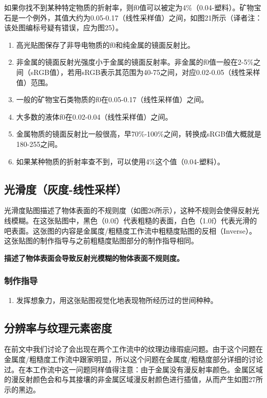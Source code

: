 如果你找不到某种特定物质的折射率，则f0值可以被定为4\%（0.04-塑料）。矿物宝石是一个例外，其值大约为0.05-0.17（线性采样值）之间，如图21所示（译者注：该处图编标号疑有错误，应为图25）。

\begin{enumerate}
\item 高光贴图保存了非导电物质的f0和纯金属的镜面反射比。
\item 非金属的镜面反射光强度小于金属的镜面反射率。非金属的f0值一般在2-5\%之间（sRGB值），若用sRGB表示其范围为40-75之间，对应0.02-0.05（线性采样值）范围。
\item 一般的矿物宝石类物质的f0在0.05-0.17（线性采样值）之间。
\item 大多数的液体f0在0.02-0.04（线性采样值）之间。
\item 金属物质的镜面反射比一般很高，早70\%-100\%之间，转换成sRGB值大概就是180-255之间。
\item 如果某种物质的折射率查不到，可以使用4\%这个值（0.04-塑料）。
\end{enumerate}

\subsection{光滑度（灰度-线性采样）}

光滑度贴图描述了物体表面的不规则度（如图26所示），这种不规则会使得反射光线模糊。在这张贴图中，黑色（0.0f）代表粗糙的表面，白色（1.0f）代表光滑的吧表面。这张图的内容是金属度/粗糙度工作流中粗糙度贴图的反相（Inverse）。这张贴图的制作指导与之前粗糙度贴图部分的制作指导相同。

\textbf{描述了物体表面会导致反射光模糊的物体表面不规则度。}

\subsubsection{制作指导}

\begin{enumerate}
\item 发挥想象力，用这张贴图视觉化地表现物所经历过的世间种种。
\end{enumerate}

\subsection{分辨率与纹理元素密度}

在前文中我们讨论了会出现在两个工作流中的纹理边缘瑕疵问题。由于这个问题在金属度/粗糙度工作流中跟家明显，所以这个问题在金属度/粗糙度部分详细的讨论过。在本工作流中这一问题同样值得注意：由于金属没有漫反射率颜色。金属区域的漫反射颜色会和与其接壤的非金属区域漫反射颜色进行插值，从而产生如图27所示的黑边。

